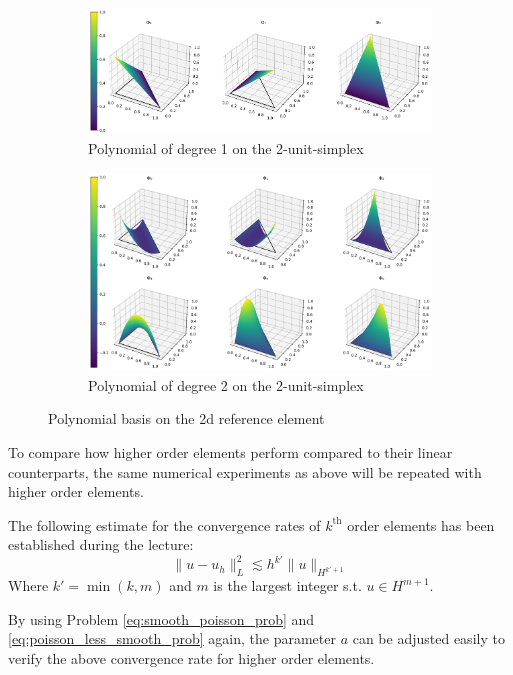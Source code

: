 \documentclass[11pt,a4paper]{article}
\begin{document}
\begin{figure}
  \centering
  \begin{subfigure}{1.\textwidth}
    \centering
    \includegraphics[width=.8\linewidth]{p1_2d_mesh_basis}
    \caption{Polynomial of degree 1 on the 2-unit-simplex}
  \end{subfigure}
  \begin{subfigure}{1.\textwidth}
    \centering
    \includegraphics[width=.8\linewidth]{p2_2d_mesh_basis}
    \caption{Polynomial of degree 2 on the 2-unit-simplex}
  \end{subfigure}
  \caption{Polynomial basis on the 2d reference element}
  \label{fig:basis_2d}
\end{figure}


To compare how higher order elements perform compared to their linear counterparts,
the same numerical experiments as above will be repeated with higher order elements.

The following estimate for the convergence rates of $k^{\text{th}}$ order
elements has been established during the lecture:
\begin{equation}
  \lVert u - u_h \rVert_L^2 \lesssim h^{k'} \lVert u \rVert_{H^{k'+1}}
\end{equation}
Where $k' = \operatorname{min}\left(k,m\right)$ and $m$ is the largest integer s.t. $u \in H^{m+1}$.

By using Problem \ref{eq:smooth_poisson_prob} and \ref{eq:poisson_less_smooth_prob}
again, the parameter $a$ can be adjusted easily to verify the above convergence
rate for higher order elements.
\end{document}
